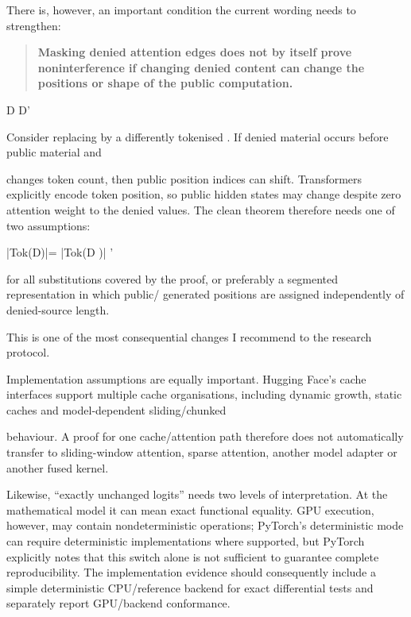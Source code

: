 \documentclass[11pt,a4paper]{article}
\begin{document}
There is, however, an important condition the current wording needs to strengthen:\par
\begin{quote}\textbf{Masking denied attention edges does not by itself prove noninterference if changing denied content can change the positions or shape of the public computation.}\end{quote}
D D'\par
Consider replacing by a differently tokenised . If denied material occurs before public material and\par
changes token count, then public position indices can shift. Transformers explicitly encode token position, so public hidden states may change despite zero attention weight to the denied values. The clean theorem therefore needs one of two assumptions:\par
|Tok(D)|= |Tok(D )| '\par
for all substitutions covered by the proof, or preferably a segmented representation in which public/ generated positions are assigned independently of denied-source length.\par
This is one of the most consequential changes I recommend to the research protocol.\par
Implementation assumptions are equally important. Hugging Face's cache interfaces support multiple cache organisations, including dynamic growth, static caches and model-dependent sliding/chunked\par
behaviour. A proof for one cache/attention path therefore does not automatically transfer to sliding-window attention, sparse attention, another model adapter or another fused kernel.\par
Likewise, “exactly unchanged logits” needs two levels of interpretation. At the mathematical model it can mean exact functional equality. GPU execution, however, may contain nondeterministic operations; PyTorch's deterministic mode can require deterministic implementations where supported, but PyTorch explicitly notes that this switch alone is not sufficient to guarantee complete reproducibility. The implementation evidence should consequently include a simple deterministic CPU/reference backend for exact differential tests and separately report GPU/backend conformance.\par
\end{document}
